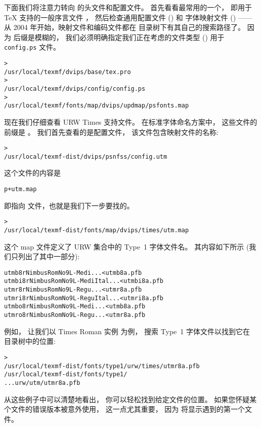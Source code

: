 \documentclass{article}
\begin{document}
下面我们将注意力转向  的头文件和配置文件。
首先看看最常用的一个，
即用于 \TeX{} 支持的一般序言文件 ，
然后检查通用配置文件 () 和 \PS{} 字体映射文件 ()
——从 2004 年开始，映射文件和编码文件都在  目录树下有其自己的搜索路径了。
因为  后缀是模糊的，
我们必须明确指定我们正在考虑的文件类型 () 用于 \texttt{config.ps} 文件。

\begin{alltt}
> 
   /usr/local/texmf/dvips/base/tex.pro
> 
   /usr/local/texmf/dvips/config/config.ps
> 
   /usr/local/texmf/fonts/map/dvips/updmap/psfonts.map
\end{alltt}

现在我们仔细查看 URW Times \PS{} 支持文件。
在标准字体命名方案中，
这些文件的前缀是 。
我们首先查看的是配置文件，
该文件包含映射文件的名称: 
\begin{alltt}
> 
   /usr/local/texmf-dist/dvips/psnfss/config.utm
\end{alltt}
这个文件的内容是
\begin{alltt}
  p +utm.map
\end{alltt}
即指向  文件，也就是我们下一步要找的。
\begin{alltt}
> 
   /usr/local/texmf-dist/fonts/map/dvips/times/utm.map
\end{alltt}
这个 map 文件定义了 URW 集合中的 Type~1 \PS{} 字体文件名。
其内容如下所示
(我们只列出了其中一部分): 
\begin{alltt}
utmb8r  NimbusRomNo9L-Medi    ... <utmb8a.pfb
utmbi8r NimbusRomNo9L-MediItal... <utmbi8a.pfb
utmr8r  NimbusRomNo9L-Regu    ... <utmr8a.pfb
utmri8r NimbusRomNo9L-ReguItal... <utmri8a.pfb
utmbo8r NimbusRomNo9L-Medi    ... <utmb8a.pfb
utmro8r NimbusRomNo9L-Regu    ... <utmr8a.pfb
\end{alltt}
例如，
让我们以 Times Roman 实例  为例，
搜索 Type~1 字体文件以找到它在  目录树中的位置: 
\begin{alltt}
> 
\ifSingleColumn   /usr/local/texmf-dist/fonts/type1/urw/times/utmr8a.pfb
\else   /usr/local/texmf-dist/fonts/type1/
... urw/utm/utmr8a.pfb
\fi\end{alltt}

从这些例子中可以清楚地看出，
你可以轻松找到给定文件的位置。
如果您怀疑某个文件的错误版本被意外使用，
这一点尤其重要，
因为  将显示遇到的第一个文件。
\end{document}
